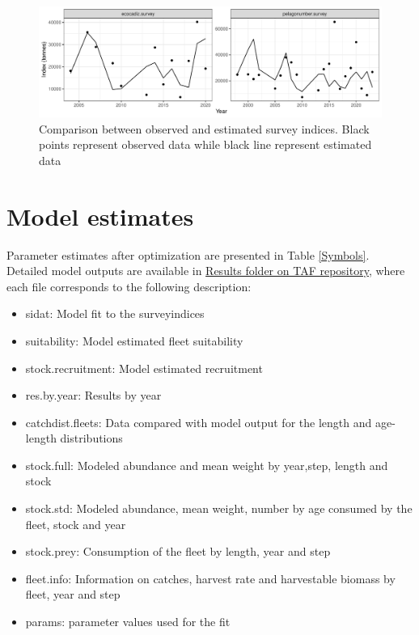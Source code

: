 \documentclass[review]{elsarticle}
\begin{document}
\begin{figure}[h!]
 \centering
 \includegraphics[bb=0 0 667 432]{./surveyfit.pdf}
 \caption{ Comparison between observed and estimated survey indices. Black points represent observed data while black line represent estimated data}
 \label{surveyfit}
\end{figure}

\clearpage
\section{Model estimates}

Parameter estimates after optimization are presented in Table \ref{Symbols}. Detailed model outputs are available in \href{https://github.com/ices-taf/2022_ane.27.9a_assessment/tree/main/results}{Results folder on TAF repository}, where each file corresponds to the following description:
\begin{itemize}
\item{sidat: }{Model fit to the surveyindices}
\item{suitability: }{Model estimated fleet suitability}
\item{stock.recruitment: }{Model estimated recruitment }
\item{res.by.year: }{Results by year}
\item{catchdist.fleets: }{Data compared with model output for the length and age-length distributions}
\item{stock.full: }{Modeled abundance and mean weight by year,step, length and stock}
\item{stock.std: }{Modeled abundance, mean weight, number by age consumed by the fleet, stock and year}
\item{stock.prey: }{Consumption of the fleet by length, year and step}
\item{fleet.info: }{Information on catches, harvest rate and harvestable biomass by fleet, year and step}
\item{params: }{parameter values used for the fit}
\end{itemize}
\end{document}
